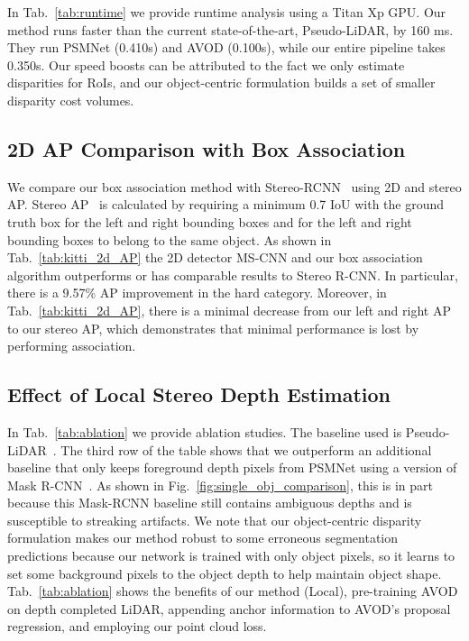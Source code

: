 \documentclass[letterpaper, 10 pt, conference]{ieeeconf}
\begin{document}
In Tab.~\ref{tab:runtime} we provide runtime analysis using a Titan Xp GPU. Our method runs faster than the current state-of-the-art, Pseudo-LiDAR, by 160 ms. They run PSMNet (0.410s) and AVOD (0.100s), while our entire pipeline takes 0.350s. Our speed boosts can be attributed to the fact we only estimate disparities for RoIs, and our object-centric formulation builds a set of smaller disparity cost volumes.

\subsection{2D AP Comparison with Box Association}

We compare our box association method with Stereo-RCNN~\cite{li2019stereo_rcnn} using 2D and stereo AP. Stereo AP~\cite{li2019stereo_rcnn} is calculated by requiring a minimum 0.7 IoU with the ground truth box for the left and right bounding boxes and for the left and right bounding boxes to belong to the same object. As shown in Tab.~\ref{tab:kitti_2d_AP} the 2D detector MS-CNN and our box association algorithm outperforms or has comparable results to Stereo R-CNN. In particular, there is a 9.57\% AP improvement in the hard category. Moreover, in Tab.~\ref{tab:kitti_2d_AP}, there is a minimal decrease from our left and right AP to our stereo AP, which demonstrates that minimal performance is lost by performing association.

\subsection{Effect of Local Stereo Depth Estimation}
In Tab.~\ref{tab:ablation} we provide ablation studies. The baseline used is Pseudo-LiDAR~\cite{wang2018pseudo}. The third row of the table shows that we outperform an additional baseline that only keeps foreground depth pixels from PSMNet using a version of Mask R-CNN~\cite{he2017mask}. As shown in Fig.~\ref{fig:single_obj_comparison}, this is in part because this Mask-RCNN baseline still contains ambiguous depths and is susceptible to streaking artifacts. We note that our object-centric disparity formulation makes our method robust to some erroneous segmentation predictions because our network is trained with only object pixels, so it learns to set some background pixels to the object depth to help maintain object shape. Tab.~\ref{tab:ablation} shows the benefits of our method (Local), pre-training AVOD on depth completed LiDAR, appending anchor information to AVOD's proposal regression, and employing our point cloud loss.




\end{document}
